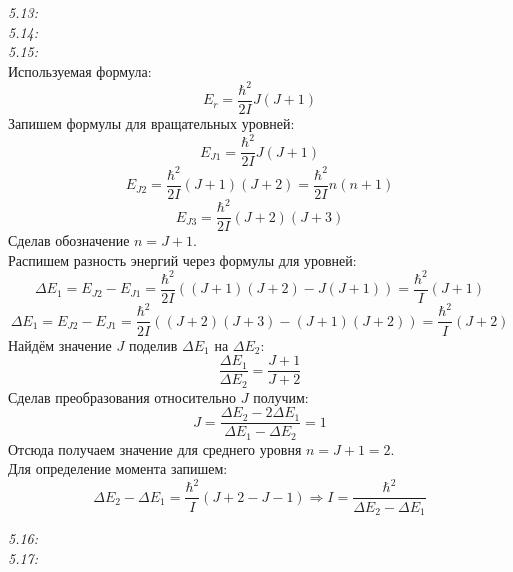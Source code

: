 	\emph{5.13: } \\

	\emph{5.14: } \\

	\emph{5.15: } \\
		Используемая формула: \[ E_r = \frac{\hbar^2}{2I}J(J+1) \]
		Запишем формулы для вращательных уровней:
		\[ E_{J1} = \frac{\hbar^2}{2I}J(J+1) \]
		\[ E_{J2} = \frac{\hbar^2}{2I}(J+1)(J+2) = \frac{\hbar^2}{2I}n(n+1) \]
		\[ E_{J3} = \frac{\hbar^2}{2I}(J+2)(J+3) \]
		Сделав обозначение \( n = J + 1 \). \\
		Распишем разность энергий через формулы для уровней:
		\[ 
			\Delta E_1 = E_{J2} - E_{J1} = 
			\frac{\hbar^2}{2I}((J+1)(J+2) - J(J+1)) = \frac{\hbar^2}{I}(J+1) 
		\]
		\[ 
			\Delta E_1 = E_{J2} - E_{J1} =
			\frac{\hbar^2}{2I}((J+2)(J+3)-(J+1)(J+2)) = \frac{\hbar^2}{I}(J+2)
		\]
		Найдём значение \( J \) поделив \( \Delta E_1 \) на \( \Delta E_2 \):
		\[ \frac{\Delta E_1}{\Delta E_2} = \frac{J+1}{J+2} \]
		Сделав преобразования относительно \( J \) получим:
		\[ J = \frac{\Delta E_2 - 2\Delta E_1}{\Delta E_1 - \Delta E_2} = 1 \]
		Отсюда получаем значение для среднего уровня \( n = J+1 = 2 \). \\
		Для определение момента запишем: 
		\[ 
			\Delta E_2 - \Delta E_1 = \frac{\hbar^2}{I}(J+2-J-1) 
			\Rightarrow I = \frac{\hbar^2}{\Delta E_2 - \Delta E_1}
		\]

	\emph{5.16: } \\

	\emph{5.17: } \\

